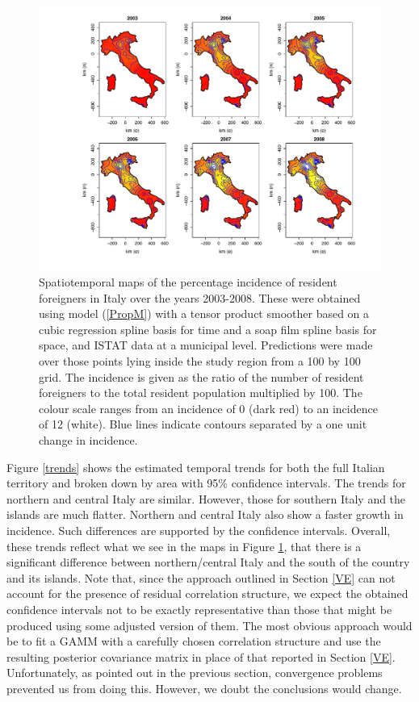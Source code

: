 \begin{figure}[tbp]
	\centering
		\includegraphics[width=\textwidth]{it/maps-Soap.pdf}
	\caption{Spatiotemporal maps of the percentage incidence of resident foreigners in Italy over the years 2003-2008. These were obtained using model (\ref{PropM}) with a tensor product smoother based on a cubic regression spline basis for time and a soap film spline basis for space, and ISTAT data at a municipal level. Predictions were made over those points lying inside the study region from a 100 by 100 grid. The incidence is given as the ratio of the number of resident foreigners to the total resident population multiplied by 100. The colour scale ranges from an incidence of 0 (dark red) to an incidence of 12 (white). Blue lines indicate contours separated by a one unit change in incidence.}
	\label{it-fig1}
\end{figure}

Figure \ref{trends} shows the estimated temporal trends for both the full Italian territory and broken down by area with 95\% confidence intervals. The trends for northern and central Italy are similar. However, those for southern Italy and the islands are much flatter. Northern and central Italy also show a faster growth in incidence. Such differences are supported by the confidence intervals. Overall, these trends reflect what we see in the maps in Figure \ref{it-fig1}, that there is a significant difference between northern/central Italy and the south of the country and its islands. Note that, since the approach outlined in Section \ref{VE} can not account for the presence of residual correlation structure, we expect the obtained confidence intervals not to be exactly representative than those that might be produced using some adjusted version of them. The most obvious approach would be to fit a GAMM with a carefully chosen correlation structure and use the resulting posterior covariance matrix in place of that reported in Section \ref{VE}. Unfortunately, as pointed out in the previous section, convergence problems prevented us from doing this. However, we doubt the conclusions would change.

